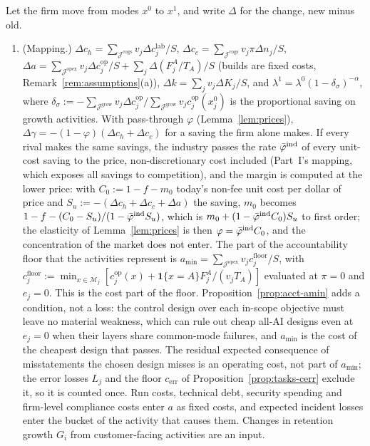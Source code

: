 \begin{proposition}[Aggregation]\label{prop:tasks-aggregate}
Let the firm move from modes $x^0$ to $x^1$, and write $\Delta$ for the change, new minus old.
\begin{enumerate}
\item[(a)] (Mapping.) $\Delta c_h=\sum_{\mathcal J^{\mathrm{cogs}}}v_j\Delta c^{\mathrm{lab}}_j/S$, $\Delta c_c=\sum_{\mathcal J^{\mathrm{cogs}}}v_j\pi\Delta n_j/S$, $\Delta a=\sum_{\mathcal J^{\mathrm{opex}}}v_j\Delta c^{\mathrm{op}}_j/S+\sum_j\Delta(F^A_j/T_A)/S$ (builds are fixed costs, Remark~\ref{rem:assumptions}(a)), $\Delta k=\sum_jv_j\Delta K_j/S$, and $\lambda^1=\lambda^0(1-\delta_\sigma)^{-\alpha}$, where $\delta_\sigma:=-\sum_{\mathcal J^{\mathrm{grow}}}v_j\Delta c^{\mathrm{op}}_j/\sum_{\mathcal J^{\mathrm{grow}}}v_jc^{\mathrm{op}}_j(x^0_j)$ is the proportional saving on growth activities. With pass-through $\varphi$ (Lemma~\ref{lem:prices}), $\Delta\gamma=-(1-\varphi)(\Delta c_h+\Delta c_c)$ for a saving the firm alone makes. If every rival makes the same savings, the industry passes the rate $\bar\varphi^{\rm ind}$ of every unit-cost saving to the price, non-discretionary cost included (Part~I's mapping, which exposes all savings to competition), and the margin is computed at the lower price: with $C_0:=1-f-m_0$ today's non-fee unit cost per dollar of price and $S_u:=-(\Delta c_h+\Delta c_c+\Delta a)$ the saving, $m_0$ becomes $1-f-(C_0-S_u)/(1-\bar\varphi^{\rm ind}S_u)$, which is $m_0+(1-\bar\varphi^{\rm ind}C_0)S_u$ to first order; the elasticity of Lemma~\ref{lem:prices} is then $\varphi=\bar\varphi^{\rm ind}C_0$, and the concentration of the market does not enter. The part of the accountability floor that the activities represent is $a_{\min}=\sum_{\mathcal J^{\mathrm{opex}}}v_jc^{\mathrm{floor}}_j/S$, with $c^{\mathrm{floor}}_j:=\min_{x\in\mathcal M_j}[c^{\mathrm{op}}_j(x)+\mathbf 1\{x=A\}F^A_j/(v_jT_A)]$ evaluated at $\pi=0$ and $e_j=0$. This is the cost part of the floor. Proposition~\ref{prop:acct-amin} adds a condition, not a loss: the control design over each in-scope objective must leave no material weakness, which can rule out cheap all-AI designs even at $e_j=0$ when their layers share common-mode failures, and $a_{\min}$ is the cost of the cheapest design that passes. The residual expected consequence of misstatements the chosen design misses is an operating cost, not part of $a_{\min}$; the error losses $L_j$ and the floor $c_{\mathrm{err}}$ of Proposition~\ref{prop:tasks-cerr} exclude it, so it is counted once. Run costs, technical debt, security spending and firm-level compliance costs enter $a$ as fixed costs, and expected incident losses enter the bucket of the activity that causes them. Changes in retention growth $G_i$ from customer-facing activities are an input.

\end{enumerate}
\end{proposition}
